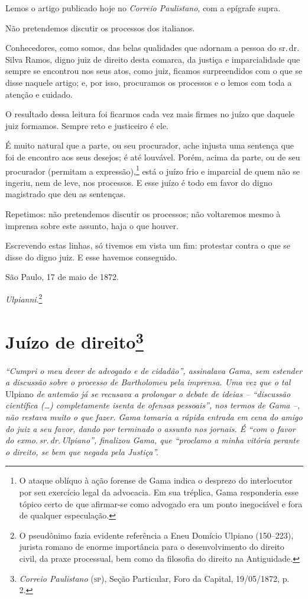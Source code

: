 Lemos o artigo publicado hoje no \emph{Correio Paulistano}, com a
epígrafe supra.

Não pretendemos discutir os processos dos italianos.

Conhecedores, como somos, das belas qualidades que adornam a pessoa do
sr.\,dr.\,Silva Ramos, digno juiz de direito desta comarca, da justiça e
imparcialidade que sempre se encontrou nos seus atos, como juiz, ficamos
surpreendidos com o que se disse naquele artigo; e, por isso, procuramos
os processos e o lemos com toda a atenção e cuidado.

O resultado dessa leitura foi ficarmos cada vez mais firmes no juízo que
daquele juiz formamos. Sempre reto e justiceiro é ele.

É muito natural que a parte, ou seu procurador, ache injusta uma
sentença que foi de encontro aos seus desejos; é até louvável. Porém,
acima da parte, ou de seu procurador (permitam a expressão),\footnote{
  O ataque oblíquo à ação forense de Gama indica o desprezo do
  interlocutor por seu exercício legal da advocacia. Em sua tréplica,
  Gama responderia esse tópico certo de que afirmar-se como advogado era
  um ponto inegociável e fora de qualquer especulação.} está o juízo
frio e imparcial de quem não se ingeriu, nem de leve, nos processos. E
esse juízo é todo em favor do digno magistrado que deu as sentenças.

Repetimos: não pretendemos discutir os processos; não voltaremos mesmo à
imprensa sobre este assunto, haja o que houver.

Escrevendo estas linhas, só tivemos em vista um fim: protestar contra o
que se disse do digno juiz. E esse havemos conseguido.

São Paulo, 17 de maio de 1872.

\emph{Ulpianni}.\footnote{ O pseudônimo fazia evidente referência a
  Eneu Domício Ulpiano (150--223), jurista romano de enorme importância
  para o desenvolvimento do direito civil, da praxe processual, bem como
  da filosofia do direito na Antiguidade.}

\chapter{Juízo de direito\footnote{\emph{Correio Paulistano} (\textsc{sp}), Seção Particular, Foro
  da Capital, 19/05/1872, p.\,2.}} %

\begin{didascalia}
\emph{``Cumpri o meu dever de advogado e de cidadão'', assinalava Gama,
sem estender a discussão sobre o processo de Bartholomeu pela imprensa.
Uma vez que o tal} Ulpiano \emph{de antemão já se recusava a prolongar o
debate de ideias -- ``discussão científica (\ldots{}) completamente isenta de
ofensas pessoais'', nos termos de Gama --, não restava muito o que fazer.
Gama tomaria a rápida entrada em cena do amigo do juiz a seu favor,
dando por terminado o assunto nos jornais. É ``com o favor do exmo.\,sr.\,dr.\,Ulpiano'', finalizou Gama, que ``proclamo a minha vitória perante o
direito, se bem que negada pela Justiça''.}
\end{didascalia}

